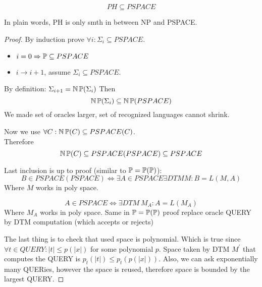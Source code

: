 \begin{theorem}
	\[ PH \subseteq PSPACE \]

	In plain words, PH is only smth in between NP and PSPACE.
\end{theorem}
\begin{proof}
	By induction prove $\forall i: \Sigma_i \subseteq PSPACE$.

	\begin{itemize}
		\item $i = 0 \Rightarrow \operatorname{\mathbb{P}} \subseteq PSPACE$
		\item $i \to i + 1$, assume $\Sigma_i \subseteq PSPACE$.
	\end{itemize}

	By definition: $\Sigma_{i + 1} = \operatorname{\operatorname{\mathbb{N}}\mathbb{P}}(\Sigma_i)$
	Then
	\[ \operatorname{\operatorname{\mathbb{N}}\mathbb{P}}(\Sigma_i) \subseteq \operatorname{\operatorname{\mathbb{N}}\mathbb{P}}(PSPACE) \]
	We made set of oracles larger, set of recognized languages cannot shrink.

	Now we use $\forall C: \operatorname{\operatorname{\mathbb{N}}\mathbb{P}}(C) \subseteq PSPACE(C)$.\\
	Therefore
	\[ \operatorname{\operatorname{\mathbb{N}}\mathbb{P}}(C) \subseteq PSPACE(PSPACE) \subseteq PSPACE \]

	Last inclusion is up to proof (similar to $\operatorname{\mathbb{P}} = \operatorname{\mathbb{P}}(\operatorname{\mathbb{P}})$):\\
	\[ B \in PSPACE(PSPACE) \iff \exists A \in PSPACE \exists DTM M: B = L(M, A) \]
	Where $M$ works in poly space.

	\[ A \in PSPACE \iff \exists DTM \ M_A: A = L(M_A) \]
	Where $M_A$ works in poly space.
	Same in $\operatorname{\mathbb{P}} = \operatorname{\mathbb{P}}(\operatorname{\mathbb{P}})$ proof replace oracle QUERY by DTM computation (which accepts or rejects)

	The last thing is to check that used space is polynomial.
	Which is true since $\forall t \in QUERY: |t| \leq p(|x|)$ for some polynomial $p$.
	Space taken by DTM $M^{\prime}$ that computes the QUERY is $p_t(|t|) \leq p_t(p(|x|))$.
	Also, we can ask exponentially many QUERies, however the space is reused, therefore space is bounded by the largest QUERY.
\end{proof}
